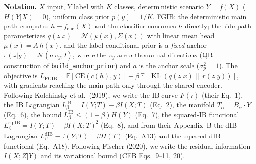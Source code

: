 
\newtheorem{lemma}{Lemma}
\newtheorem{proposition}{Proposition}
\newtheorem{remark}{Remark}

\textbf{Notation.}
$X$ input, $Y$ label with $K$ classes, deterministic scenario $Y = f(X)$ ($H(Y|X) = 0$),
uniform class prior $p(y) = 1/K$.
FGIB: the deterministic main path computes $h = f_{\mathrm{enc}}(X)$ and the classifier
consumes $h$ directly; the side path parameterizes $q(z|x) = \mathcal{N}(\mu(x), \Sigma(x))$
with linear mean head $\mu(x) = A\,h(x)$, and the label-conditional prior is a \emph{fixed}
anchor $r(z|y) = \mathcal{N}(a\,v_y, I)$, where the $v_y$ are orthonormal directions (QR
construction of \texttt{build\_anchor\_prior}) and $a$ is the anchor scale ($\sigma_p^2 = 1$).
The objective is $L_{\mathrm{FGIB}} = \mathbb{E}[\mathrm{CE}(c(h), y)]
+ \beta\,\mathbb{E}[\operatorname{KL}(q(z|x)\,\|\,r(z|y))]$, with gradients reaching the main
path only through the shared encoder.
Following Kolchinsky et al.\ (2019), we write the IB curve $F(r)$ (their Eq.~1), the IB
Lagrangian $L^{\mathrm{IB}}_\beta = I(Y;T) - \beta I(X;T)$ (Eq.~2), the manifold
$T_\alpha = B_\alpha \cdot Y$ (Eq.~6), the bound $L^{\mathrm{IB}}_\beta \le (1-\beta)H(Y)$
(Eq.~7), the squared-IB functional $L^{\mathrm{sq\text{-}IB}}_\beta = I(Y;T) - \beta I(X;T)^2$
(Eq.~8), and from their Appendix~B the dIB Lagrangian $L^{\mathrm{dIB}}_\beta = I(Y;T) - \beta H(T)$
(Eq.~A13) and the squared-dIB functional (Eq.~A18).
Following Fischer (2020), we write the residual information $I(X;Z|Y)$ and its variational
bound (CEB Eqs.~9--11, 20).

